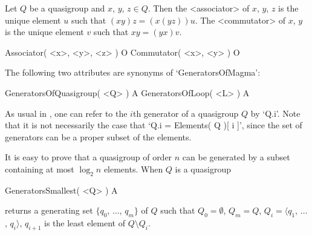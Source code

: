 Let $Q$ be a quasigroup and $x$, $y$, $z\in Q$. Then the <associator>
%
%
 of
$x$, $y$, $z$ is the unique element $u$ such that $(xy)z=(x(yz))u$. The
<commutator>
%
%
 of $x$, $y$ is the unique element $v$ such that $xy=(yx)v$.

\>Associator( <x>, <y>, <z> ) O
\>Commutator( <x>, <y> ) O


The following two attributes are synonyms of `GeneratorsOfMagma':

\>GeneratorsOfQuasigroup( <Q> ) A
\>GeneratorsOfLoop( <L> ) A

As usual in {\GAP}, one can refer to the $i$th generator of a quasigroup $Q$ by
`Q.i'. Note that it is not necessarily the case that `Q.i = Elements( Q )[ i
]', since the set of generators can be a proper subset of the elements.

It is easy to prove that a quasigroup of order $n$ can be generated by a subset
containing at most $\log_2{n}$ elements. When $Q$ is a quasigroup

\>GeneratorsSmallest( <Q> ) A

returns a generating set $\{q_0$, $\dots$, $q_m\}$ of $Q$ such that
$Q_0=\emptyset$, $Q_m=Q$, $Q_i=\langle q_1$, $\dots$, $q_i \rangle$, $q_{i+1}$
is the least element of $Q\setminus Q_i$.
